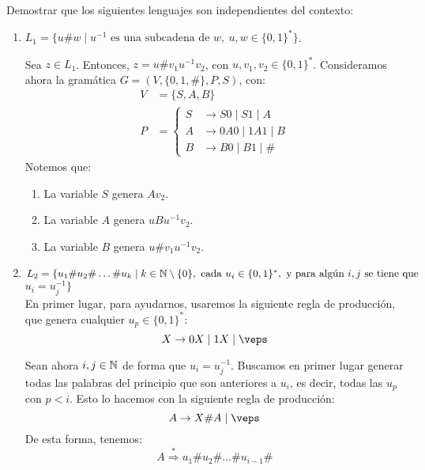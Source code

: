 \begin{ejercicio}\label{ej:1.4.16}
    Demostrar que los siguientes lenguajes son independientes del contexto:
    \begin{enumerate}
        \item $L_1 = \{ u \# w \mid u^{-1} \text{ es una subcadena de } w,~u, w \in \{ 0, 1 \}^* \}$.
        
        Sea $z\in L_1$. Entonces, $z=u\#v_1u^{-1}v_2$, con $u,v_1,v_2\in \{0,1\}^*$. Consideramos ahora la gramática $G=(V,\{0,1,\#\},P,S)$, con:
        \begin{equation*}
            \begin{aligned}
                V &= \{ S, A, B\} \\
                P &= \left\{
                    \begin{aligned}
                        S &\rightarrow S0 \mid S1\mid A \\
                        A & \rightarrow 0A0 \mid 1A1 \mid B \\
                        B &\rightarrow B0 \mid B1 \mid \#
                    \end{aligned}
                \right.
            \end{aligned}
        \end{equation*}
        Notemos que:
        \begin{enumerate}
            \item La variable $S$ genera $Av_2$.
            \item La variable $A$ genera $uBu^{-1}v_2$.
            \item La variable $B$ genera $u\#v_1u^{-1}v_2$.
        \end{enumerate}
        
        \item $L_2 = \{ u_1 \# u_2 \# \ldots \# u_k \mid k\in \mathbb{N}\setminus \{0\}, \text{ cada } u_i \in \{ 0, 1 \}^*, \text{ y para algún } i,j \text{ se tiene que }$ $u_i=u_j^{-1} \}$\\

        En primer lugar, para ayudarnos, usaremos la siguiente regla de producción, que genera cualquier $u_p\in \{0,1\}^*$:
        \begin{equation*}
            X\to 0X \mid 1X \mid \veps
        \end{equation*}
    
        Sean ahora $i,j\in \mathbb{N}$ de forma que $u_i=u_j^{-1}$. Buscamos en primer lugar generar todas las palabras del principio que son anteriores a $u_i$, es decir, todas las $u_p$ con $p<i$. Esto lo hacemos con la siguiente regla de producción:
        \begin{equation*}
            A\to X\#A \mid \veps
        \end{equation*}
        De esta forma, tenemos:
        \begin{equation*}
            A \stackrel{\ast}{\Longrightarrow} u_1\#u_2\#\dots\#u_{i-1}\#
        \end{equation*}
    

\end{enumerate}
\end{ejercicio}
